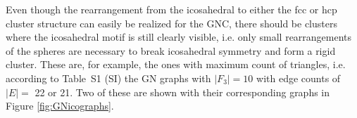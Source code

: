 Even though the rearrangement from the icosahedral to either the fcc or hcp
cluster structure can easily be realized for the GNC, there should be clusters
where the icosahedral motif is still clearly visible, i.e. only small
rearrangements of the spheres are necessary to break icosahedral symmetry and form
a rigid cluster. These are, for example, the ones with maximum count of
triangles, i.e. according to Table~S1 (SI) the GN graphs with $|F_3|=10$ with
edge counts of $|E|=$ 22 or 21. Two of these are shown with their corresponding
graphs in Figure \ref{fig:GNicographs}.
\begin{figure}[htb]
    \centering
    \\

\end{figure}
